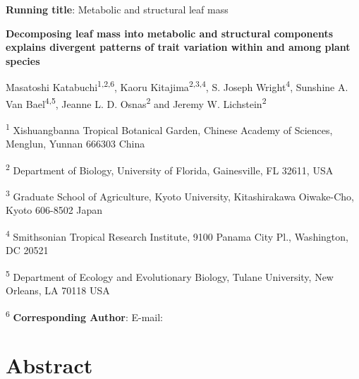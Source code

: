 \documentclass[
  12pt,
  a4paper,
,tablecaptionabove
]{scrartcl}
\date{}
\title{}
\author{}
\providecommand{\DIFaddtex}[1]{{\protect\color{blue}\uwave{#1}}} %
\providecommand{\DIFaddbegin}{} %
\providecommand{\DIFaddend}{} %
\providecommand{\DIFdelbegin}{} %
\providecommand{\DIFdelend}{} %
\providecommand{\DIFadd}[1]{\texorpdfstring{\DIFaddtex{#1}}{#1}} %
\newcommand{\DIFscaledelfig}{0.5}
\newlength{\DIFdelgraphicswidth} %
\newlength{\DIFdelgraphicsheight} %
\newcommand{\DIFaddincludegraphics}[2][]{{\color{blue}\fbox{\DIFOincludegraphics[#1]{#2}}}} %
\newcommand{\DIFdelincludegraphics}[2][]{%
\sbox{\DIFdelgraphicsbox}{\DIFOincludegraphics[#1]{#2}}%
\settoboxwidth{\DIFdelgraphicswidth}{\DIFdelgraphicsbox} %
\settoboxtotalheight{\DIFdelgraphicsheight}{\DIFdelgraphicsbox} %
\scalebox{\DIFscaledelfig}{%
\parbox[b]{\DIFdelgraphicswidth}{\usebox{\DIFdelgraphicsbox}\\[-\baselineskip] \rule{\DIFdelgraphicswidth}{0em}}\llap{\resizebox{\DIFdelgraphicswidth}{\DIFdelgraphicsheight}{%
\setlength{\unitlength}{\DIFdelgraphicswidth}%
\begin{picture}(1,1)%
\thicklines\linethickness{2pt} %
{\color[rgb]{1,0,0}\put(0,0){\framebox(1,1){}}}%
{\color[rgb]{1,0,0}\put(0,0){\line( 1,1){1}}}%
{\color[rgb]{1,0,0}\put(0,1){\line(1,-1){1}}}%
\end{picture}%
}\hspace*{3pt}}} %
} %
\DeclareRobustCommand{\DIFaddbegin}{\DIFOaddbegin \let\includegraphics\DIFaddincludegraphics} %
\DeclareRobustCommand{\DIFaddend}{\DIFOaddend \let\includegraphics\DIFOincludegraphics} %
\DeclareRobustCommand{\DIFdelbegin}{\DIFOdelbegin \let\includegraphics\DIFdelincludegraphics} %
\DeclareRobustCommand{\DIFdelend}{\DIFOaddend \let\includegraphics\DIFOincludegraphics} %
\begin{document}




\DIFaddbegin \ifdefined\Shaded\renewenvironment{Shaded}{\begin{tcolorbox}[borderline west={3pt}{0pt}{shadecolor}, breakable, boxrule=0pt, frame hidden, enhanced, interior hidden, sharp corners]}{\end{tcolorbox}}\fi

\DIFaddend \textbf{Running title}: Metabolic and structural leaf mass

\textbf{Decomposing leaf mass into metabolic and structural components
explains divergent patterns of trait variation within and among plant
species}

Masatoshi Katabuchi\textsuperscript{1,2,6}, Kaoru
Kitajima\textsuperscript{2,3,4}, S. Joseph Wright\textsuperscript{4},
Sunshine A. Van Bael\textsuperscript{4,5}, Jeanne L. D.
Osnas\textsuperscript{2} and Jeremy W. Lichstein\textsuperscript{2}

\textsuperscript{1} Xishuangbanna Tropical Botanical Garden, Chinese
Academy of Sciences, Menglun, Yunnan 666303 China

\textsuperscript{2} Department of Biology, University of Florida,
Gainesville, FL 32611, USA

\textsuperscript{3} Graduate School of Agriculture, Kyoto University,
Kitashirakawa Oiwake-Cho, Kyoto 606-8502 Japan

\textsuperscript{4} Smithsonian Tropical Research Institute, 9100 Panama
City Pl., Washington, DC 20521

\textsuperscript{5} Department of Ecology and Evolutionary Biology,
Tulane University, New Orleans, LA 70118 USA

\textsuperscript{6} \textbf{Corresponding Author}: E-mail:
\DIFdelbegin %
\DIFdelend \DIFaddbegin \DIFadd{mattocci27@gmail.com
}\DIFaddend 

\newpage

\hypertarget{abstract}{%
\section{Abstract}\label{abstract}}
\end{document}
